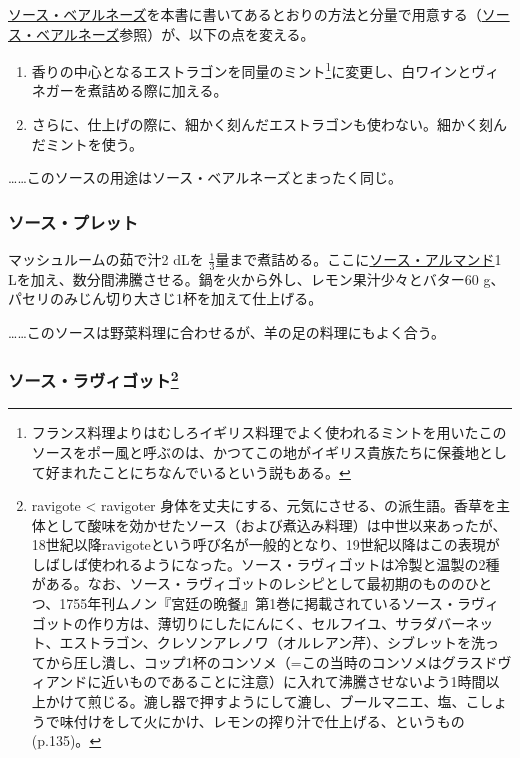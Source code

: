\begin{recette}
\protect\hyperlink{sauce-bearnaise}{ソース・ベアルネーズ}を本書に書いてあるとおりの方法と分量で用意する（\protect\hyperlink{sauce-bearnaise}{ソース・ベアルネーズ}参照）が、以下の点を変える。

\begin{enumerate}
\def\labelenumi{\arabic{enumi}.}
\item
  香りの中心となるエストラゴンを同量のミント\footnote{フランス料理よりはむしろイギリス料理でよく使われるミントを用いたこのソースをポー風と呼ぶのは、かつてこの地がイギリス貴族たちに保養地として好まれたことにちなんでいるという説もある。}に変更し、白ワインとヴィネガーを煮詰める際に加える。
\item
  さらに、仕上げの際に、細かく刻んだエストラゴンも使わない。細かく刻んだミントを使う。
\end{enumerate}

\ldots{}\ldots{}このソースの用途はソース・ベアルネーズとまったく同じ。

\hypertarget{sauce-poulette}{%
\subsubsection{ソース・プレット}\label{sauce-poulette}}



マッシュルームの茹で汁2 dLを
\(\frac{1}{3}\)量まで煮詰める。ここに\protect\hyperlink{sauce-allemande}{ソース・アルマンド}1
Lを加え、数分間沸騰させる。鍋を火から外し、レモン果汁少々とバター60
g、パセリのみじん切り大さじ1杯を加えて仕上げる。

\ldots{}\ldots{}このソースは野菜料理に合わせるが、羊の足の料理にもよく合う。

\hypertarget{sauce-ravigote}{%
\subsubsection[ソース・ラヴィゴット]{\texorpdfstring{ソース・ラヴィゴット\footnote{ravigote
  \textless{} ravigoter
  身体を丈夫にする、元気にさせる、の派生語。香草を主体として酸味を効かせたソース（および煮込み料理）は中世以来あったが、18世紀以降ravigoteという呼び名が一般的となり、19世紀以降はこの表現がしばしば使われるようになった。ソース・ラヴィゴットは冷製と温製の2種がある。なお、ソース・ラヴィゴットのレシピとして最初期のもののひとつ、1755年刊ムノン『宮廷の晩餐』第1巻に掲載されているソース・ラヴィゴットの作り方は、薄切りにしたにんにく、セルフイユ、サラダバーネット、エストラゴン、クレソンアレノワ（オルレアン芹）、シブレットを洗ってから圧し潰し、コップ1杯のコンソメ（=この当時のコンソメはグラスドヴィアンドに近いものであることに注意）に入れて沸騰させないよう1時間以上かけて煎じる。漉し器で押すようにして漉し、ブールマニエ、塩、こしょうで味付けをして火にかけ、レモンの搾り汁で仕上げる、というもの(p.135)。}}{ソース・ラヴィゴット}}\label{sauce-ravigote}}


\end{recette}

